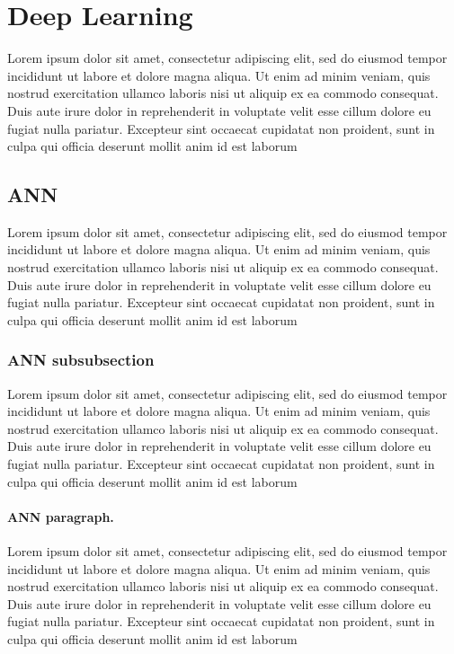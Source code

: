 \documentclass[english,a4paper,11pt,oneside,onecolumn]{book}
\begin{document}
\section{Deep Learning}
\label{sec:dl}
Lorem ipsum dolor sit amet, consectetur adipiscing elit, sed do eiusmod tempor incididunt ut labore et dolore magna aliqua. Ut enim ad minim veniam, quis nostrud exercitation ullamco laboris nisi ut aliquip ex ea commodo consequat. Duis aute irure dolor in reprehenderit in voluptate velit esse cillum dolore eu fugiat nulla pariatur. Excepteur sint occaecat cupidatat non proident, sunt in culpa qui officia deserunt mollit anim id est laborum

\subsection{ANN}
Lorem ipsum dolor sit amet, consectetur adipiscing elit, sed do eiusmod tempor incididunt ut labore et dolore magna aliqua. Ut enim ad minim veniam, quis nostrud exercitation ullamco laboris nisi ut aliquip ex ea commodo consequat. Duis aute irure dolor in reprehenderit in voluptate velit esse cillum dolore eu fugiat nulla pariatur. Excepteur sint occaecat cupidatat non proident, sunt in culpa qui officia deserunt mollit anim id est laborum


\subsubsection{ANN subsubsection}
Lorem ipsum dolor sit amet, consectetur adipiscing elit, sed do eiusmod tempor incididunt ut labore et dolore magna aliqua. Ut enim ad minim veniam, quis nostrud exercitation ullamco laboris nisi ut aliquip ex ea commodo consequat. Duis aute irure dolor in reprehenderit in voluptate velit esse cillum dolore eu fugiat nulla pariatur. Excepteur sint occaecat cupidatat non proident, sunt in culpa qui officia deserunt mollit anim id est laborum

\paragraph{ANN paragraph.}
Lorem ipsum dolor sit amet, consectetur adipiscing elit, sed do eiusmod tempor incididunt ut labore et dolore magna aliqua. Ut enim ad minim veniam, quis nostrud exercitation ullamco laboris nisi ut aliquip ex ea commodo consequat. Duis aute irure dolor in reprehenderit in voluptate velit esse cillum dolore eu fugiat nulla pariatur. Excepteur sint occaecat cupidatat non proident, sunt in culpa qui officia deserunt mollit anim id est laborum
\end{document}
